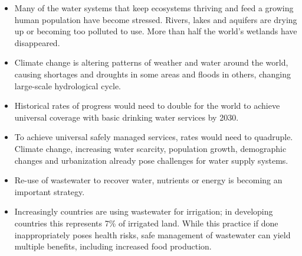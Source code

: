\begin{itemize}
\item Many of the water systems that keep ecosystems thriving and feed a growing human population have become stressed. Rivers, lakes and aquifers are drying up or becoming too polluted to use. More than half the world’s wetlands have disappeared.
\item Climate change is altering patterns of weather and water around the world, causing shortages and droughts in some areas and floods in others, changing large-scale hydrological cycle.\\
\item Historical rates of progress would need to double for the world to achieve universal coverage with basic drinking water services by 2030. 
\item To achieve universal safely managed services, rates would need to quadruple. Climate change, increasing water scarcity, population growth, demographic changes and urbanization already pose challenges for water supply systems. 
\item Re-use of wastewater to recover water, nutrients or energy is becoming an important strategy. 
\item Increasingly countries are using wastewater for irrigation; in developing countries this represents 7\% of irrigated land. While this practice if done inappropriately poses health risks, safe management of wastewater can yield multiple benefits, including increased food production.
\end{itemize}


